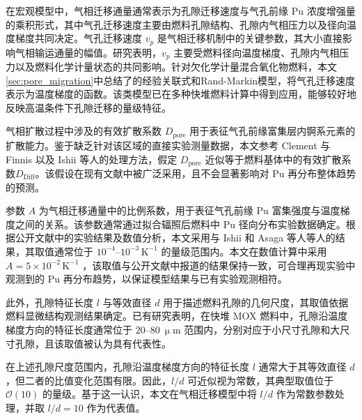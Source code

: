 在宏观模型中，气相迁移通量通常表示为孔隙迁移速度与气孔前缘 Pu 浓度增强量的乘积形式，其中气孔迁移速度主要由燃料孔隙结构、孔隙内气相压力以及径向温度梯度共同决定。气孔迁移速度 $v_p$ 是气相迁移机制中的关键参数，其大小直接影响气相输运通量的幅值。研究表明，$v_p$ 主要受燃料径向温度梯度、孔隙内气相压力以及燃料化学计量状态的共同影响。针对欠化学计量混合氧化物燃料，本文\ref{sec:pore_migration}中总结了的经验关联式和Rand\--Markin模型，将气孔迁移速度表示为温度梯度的函数。该类模型已在多种快堆燃料计算中得到应用，能够较好地反映高温条件下孔隙迁移的量级特征。

气相扩散过程中涉及的有效扩散系数 $D_{\mathrm{pore}}$ 用于表征气孔前缘富集层内锕系元素的扩散能力。鉴于缺乏针对该区域的直接实验测量数据，本文参考 Clement 与 Finnis\cite{clementPlutoniumRedistributionMixed1978} 以及 Ishii\cite{ishiiInvestigationPuMigration2001} 等人的处理方法，假定 $D_{\mathrm{pore}}$ 近似等于燃料基体中的有效扩散系数$D_{\mathrm{Diff}}$。该假设在现有文献中\cite{clementPlutoniumRedistributionMixed1978,ishiiInvestigationPuMigration2001}被广泛采用，且不会显著影响对 Pu 再分布整体趋势的预测。

参数 $A$ 为气相迁移通量中的比例系数，用于表征气孔前缘 Pu 富集强度与温度梯度之间的关系。该参数通常通过拟合辐照后燃料中 Pu 径向分布实验数据确定。根据公开文献中的实验结果及数值分析，本文采用与 Ishii 和 Asaga 等人\cite{ishiiInvestigationPuMigration2001,dimarcelloModellingActinideRedistribution2014}等人的结果，其取值通常位于 $10^{-4}$--$10^{-3}\,\mathrm{K^{-1}}$ 的量级范围内。本文在数值计算中采用 $A = 5\times10^{-2}\,\mathrm{K^{-1}}$ \cite{clementPlutoniumRedistributionMixed1978,ishiiInvestigationPuMigration2001,dimarcelloModellingActinideRedistribution2014}，该取值与公开文献\cite{dimarcelloModellingActinideRedistribution2014}中报道的结果保持一致，可合理再现实验中观测到的 Pu 再分布趋势，以保证模型结果与已有实验观测相符。

此外，孔隙特征长度 $l$ 与等效直径 $d$ 用于描述燃料孔隙的几何尺度，其取值依据燃料显微结构观测结果确定。已有研究表明，在快堆 MOX 燃料中，孔隙沿温度梯度方向的特征长度通常位于 $20$--$80~\upmu\mathrm{m}$ 范围内，分别对应于小尺寸孔隙和大尺寸孔隙，且该取值被认为具有代表性\cite{clementPlutoniumRedistributionMixed1978, hoffmannCrackFormationCrack1974}。

在上述孔隙尺度范围内，孔隙沿温度梯度方向的特征长度 $l$ 通常大于其等效直径 $d$，但二者的比值变化范围有限。因此，$l/d$ 可近似视为常数，其典型取值位于 $\mathcal{O}(10)$ 的量级\cite{clementPlutoniumRedistributionMixed1978}。基于这一认识，本文在气相迁移模型中将 $l/d$ 作为常数参数处理，并取 $l/d = 10$ 作为代表值。

